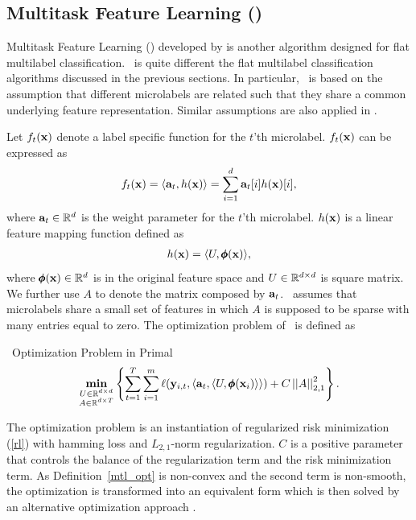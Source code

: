 {%
%
\subsection{Multitask Feature Learning (\mtl)} \label{sc_mtl}

Multitask Feature Learning (\mtl) developed by \citet{Argyriou07multitask} is another algorithm designed for flat multilabel classification.
\mtl\ is quite different the flat multilabel classification algorithms discussed in the previous sections.
In particular, \mtl\ is based on the assumption that different microlabels are related such that they share a common underlying feature representation.
Similar assumptions are also applied in \citep{Caruana97multitask,Baxter00a,BenDavide03exploiting}.

Let $f_t(\mathbf {x})$ denote a label specific function for the $t$'th microlabel.
$f_t(\mathbf {x})$ can be expressed as
\begin{align*}
	f_t(\mathbf {x}) = \langle \mathbf {a}_t, h(\mathbf {x}) \rangle = \sum_{i=1}^{d}\mathbf {a}_{t}[i]h(\mathbf {x})[i],
\end{align*}
where $\mathbf {a}_t\in\mathbb{R}^d$ is the weight parameter for the $t$'th microlabel.
$h(\mathbf {x})$ is a linear feature mapping function defined as
\begin{align*}
	h(\mathbf {x}) = \langle U, \pmb \phi(\mathbf {x}) \rangle,
\end{align*}
where $\pmb \phi(\mathbf {x})\in\mathbb{R}^d$ is in the original feature space and $U\in\mathbb{R}^{d\times d}$ is square matrix.
We further use $A$ to denote the matrix composed by $\mathbf {a}_{t}$.
\mtl\ assumes that microlabels share a small set of features in which $A$ is supposed to be sparse with many entries equal to zero.
The optimization problem of \mtl\ is defined as
\begin{definition}{\mtl\ Optimization Problem in Primal}\label{mtl_opt}
	\begin{align*}
		\underset{\substack{U\in\mathbb{R}^{d\times d}\\A\in\mathbb{R}^{d\times T}}}{\textbf{min}} \left\{\sum_{t=1}^{T}\sum_{i=1}^{m}\ell(\mathbf {y}_{i,t},\langle \mathbf {a}_t, \langle U, \pmb \phi(\mathbf {x}_i) \rangle \rangle)+C\left|\left| A \right|\right|_{2,1}^2\right\}.
	\end{align*}
\end{definition}
\noindent
The optimization problem is an instantiation of regularized risk minimization (\ref{rl}) with hamming loss and $L_{2,1}$-norm regularization.
$C$ is a positive parameter that controls the balance of the regularization term and the risk minimization term.
As Definition~\ref{mtl_opt} is non-convex and the second term is non-smooth, the optimization is transformed into an equivalent form which is then solved by an alternative optimization approach \citep{Argyriou07multitask}.

}
